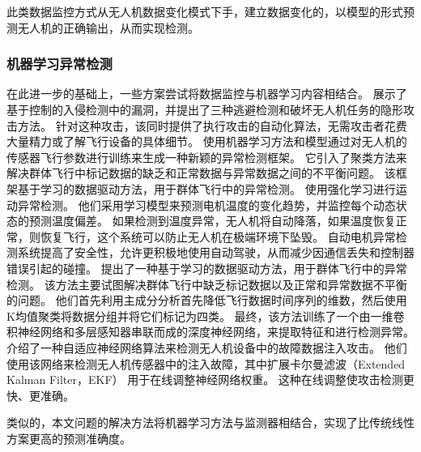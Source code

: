 此类数据监控方式从无人机数据变化模式下手，建立数据变化的，以模型的形式预测无人机的正确输出，从而实现检测。

\subsubsection{机器学习异常检测}
在此进一步的基础上，一些方案尝试将数据监控与机器学习内容相结合。
\citet{dash2021stealthy} 展示了基于控制的入侵检测中的漏洞，并提出了三种逃避检测和破坏无人机任务的隐形攻击方法。 
针对这种攻击，该同时提供了执行攻击的自动化算法，无需攻击者花费大量精力或了解飞行设备的具体细节。
\citet{sindhwani2020unsupervised}使用机器学习方法和模型通过对无人机的传感器飞行参数进行训练来生成一种新颖的异常检测框架。
它引入了聚类方法来解决群体飞行中标记数据的缺乏和正常数据与异常数据之间的不平衡问题。
该框架基于学习的数据驱动方法，用于群体飞行中的异常检测。
\citet{lu2017motor} 使用强化学习进行运动异常检测。
他们采用学习模型来预测电机温度的变化趋势，并监控每个动态状态的预测温度偏差。
如果检测到温度异常，无人机将自动降落，如果温度恢复正常，则恢复飞行，这个系统可以防止无人机在极端环境下坠毁。
自动电机异常检测系统提高了安全性，允许更积极地使用自动驾驶，从而减少因通信丢失和控制器错误引起的碰撞。
\citet{ahn2019learning}提出了一种基于学习的数据驱动方法，用于群体飞行中的异常检测。
该方法主要试图解决群体飞行中缺乏标记数据以及正常和异常数据不平衡的问题。
他们首先利用主成分分析首先降低飞行数据时间序列的维数，然后使用K均值聚类将数据分组并将它们标记为四类。 
最终，该方法训练了一个由一维卷积神经网络和多层感知器串联而成的深度神经网络，来提取特征和进行检测异常。
\citet{abbaspour2016detection} 介绍了一种自适应神经网络算法来检测无人机设备中的故障数据注入攻击。
他们使用该网络来检测无人机传感器中的注入故障，其中扩展卡尔曼滤波（Extended Kalman Filter，EKF） 用于在线调整神经网络权重。
这种在线调整使攻击检测更快、更准确。

类似的，本文问题的解决方法将机器学习方法与监测器相结合，实现了比传统线性方案更高的预测准确度。



